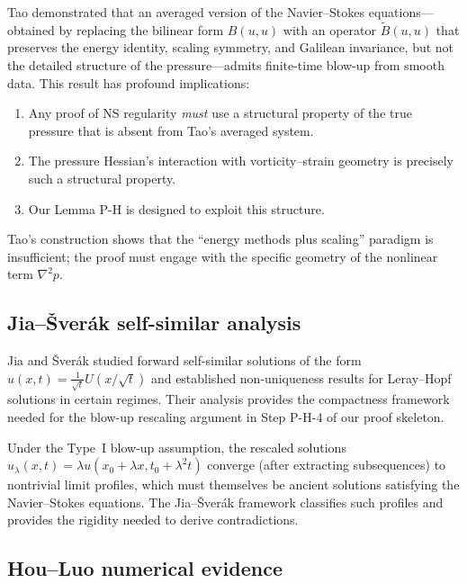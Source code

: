 \documentclass[11pt]{article}
\theoremstyle{definition}
\theoremstyle{remark}
\begin{document}
Tao \cite{Tao} demonstrated that an averaged version of the Navier--Stokes
equations---obtained by replacing the bilinear form $B(u,u)$ with an operator
$\tilde{B}(u,u)$ that preserves the energy identity, scaling symmetry, and
Galilean invariance, but not the detailed structure of the pressure---admits
finite-time blow-up from smooth data.  This result has profound implications:

\begin{enumerate}[nosep]
  \item Any proof of NS regularity \emph{must} use a structural property of the
    true pressure that is absent from Tao's averaged system.
  \item The pressure Hessian's interaction with vorticity--strain geometry is
    precisely such a structural property.
  \item Our Lemma P-H is designed to exploit this structure.
\end{enumerate}

Tao's construction shows that the ``energy methods plus scaling'' paradigm is
insufficient; the proof must engage with the specific geometry of the nonlinear
term $\nabla^2 p$.

\subsection{Jia--\v{S}ver\'ak self-similar analysis}

Jia and \v{S}ver\'ak \cite{JS} studied forward self-similar solutions of the form
$u(x,t) = \frac{1}{\sqrt{t}} U(x/\sqrt{t})$ and established non-uniqueness results
for Leray--Hopf solutions in certain regimes.  Their analysis provides the
compactness framework needed for the blow-up rescaling argument in Step P-H-4 of
our proof skeleton.

Under the Type~I blow-up assumption, the rescaled solutions
$u_\lambda(x,t) = \lambda u(x_0 + \lambda x, t_0 + \lambda^2 t)$ converge
(after extracting subsequences) to nontrivial limit profiles, which must themselves
be ancient solutions satisfying the Navier--Stokes equations.  The Jia--\v{S}ver\'ak
framework classifies such profiles and provides the rigidity needed to derive
contradictions.

\subsection{Hou--Luo numerical evidence}
\end{document}

